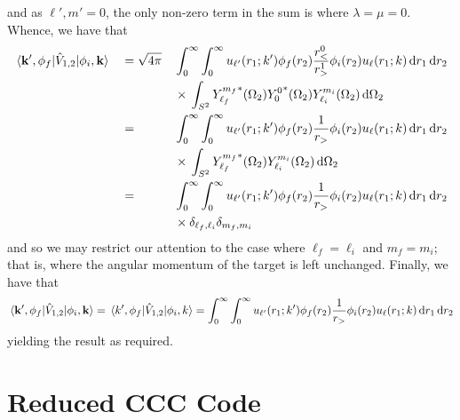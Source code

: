 \documentclass{article}
\begin{document}
and as $\ell', m' = 0$, the only non-zero term in the sum is where
$\lambda = \mu = 0$.
Whence, we have that
\begin{alignat*}{3}
  &
  \mel{\vb{k}', \phi_{f}}{\hat{V}_{1, 2}}{\phi_{i}, \vb{k}}
  &{}={}&
  \sqrt{4\pi}
  &&
  \int_{0}^{\infty}
  \int_{0}^{\infty}
  {
    u_{\ell'}(r_{1}; k')
    \phi_{f}(r_{2})
    \dfrac{r_{<}^{0}}{r_{>}^{1}}
    \phi_{i}(r_{2})
    u_{\ell}(r_{1}; k)
  }
  \dd{r_{1}}
  \dd{r_{2}}
  \\
  &
  {}
  &&
  {}
  &&
  {}\times{}
  \int_{S^{2}}
  {
    {Y_{\ell_{f}}^{m_{f}}}^{*}(\Omega_{2})
    {Y_{0}^{0}}^{*}(\Omega_{2})
    Y_{\ell_{i}}^{m_{i}}(\Omega_{2})
  }
  \dd{\Omega_{2}}
  \\
  &
  {}
  &{}={}&
  &&
  \int_{0}^{\infty}
  \int_{0}^{\infty}
  {
    u_{\ell'}(r_{1}; k')
    \phi_{f}(r_{2})
    \dfrac{1}{r_{>}}
    \phi_{i}(r_{2})
    u_{\ell}(r_{1}; k)
  }
  \dd{r_{1}}
  \dd{r_{2}}
  \\
  &
  {}
  &&
  {}
  &&
  {}\times{}
  \int_{S^{2}}
  {
    {Y_{\ell_{f}}^{m_{f}}}^{*}(\Omega_{2})
    Y_{\ell_{i}}^{m_{i}}(\Omega_{2})
  }
  \dd{\Omega_{2}}
  \\
  &
  {}
  &{}={}&
  &&
  \int_{0}^{\infty}
  \int_{0}^{\infty}
  {
    u_{\ell'}(r_{1}; k')
    \phi_{f}(r_{2})
    \dfrac{1}{r_{>}}
    \phi_{i}(r_{2})
    u_{\ell}(r_{1}; k)
  }
  \dd{r_{1}}
  \dd{r_{2}}
  \\
  &
  {}
  &&
  {}
  &&
  {}\times{}
  \delta_{\ell_{f}, \ell_{i}}
  \delta_{m_{f}, m_{i}}
\end{alignat*}
and so we may restrict our attention to the case where
$\ell_{f} = \ell_{i}$ and $m_{f} = m_{i}$; that is, where the angular momentum
of the target is left unchanged.
Finally, we have that
\begin{equation*}
  \mel{\vb{k}', \phi_{f}}{\hat{V}_{1, 2}}{\phi_{i}, \vb{k}}
  =
  \mel{k', \phi_{f}}{\hat{V}_{1, 2}}{\phi_{i}, k}
  =
  \int_{0}^{\infty}
  \int_{0}^{\infty}
  {
    u_{\ell'}(r_{1}; k')
    \phi_{f}(r_{2})
    \dfrac{1}{r_{>}}
    \phi_{i}(r_{2})
    u_{\ell}(r_{1}; k)
  }
  \dd{r_{1}}
  \dd{r_{2}}
\end{equation*}
yielding the result as required.

\clearpage

\section{Reduced CCC Code}
\label{sec:reduced-ccc-code}
\end{document}
